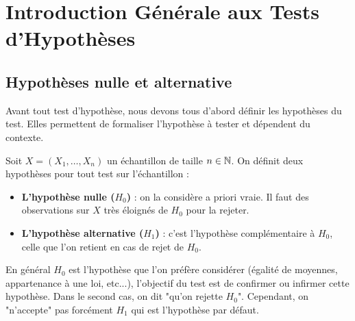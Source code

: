 
\minitoc  %





\section{Introduction Générale aux Tests d'Hypothèses}

\subsection{Hypothèses nulle et alternative}

Avant tout test d'hypothèse, nous devons tous d'abord définir les hypothèses du test. 
Elles permettent de formaliser l'hypothèse à tester et dépendent du contexte. 

\newpage 

\begin{definition}
    Soit $X = (X_1, \dots, X_n)$ un échantillon de taille $n \in \mathbb{N}$. On définit deux hypothèses pour tout test sur 
    l'échantillon : 
    \begin{itemize}
        \item \textbf{L'hypothèse nulle ($H_0$)} : on la considère a priori vraie. Il faut des observations sur $X$ très 
         éloignés de $H_0$ pour la rejeter. 
        \item \textbf{L'hypothèse alternative ($H_1$)} : c'est l'hypothèse complémentaire à $H_0$, celle que l'on 
        retient en cas de rejet de $H_0$. 
    \end{itemize}
\end{definition}

En général $H_0$ est l'hypothèse que l'on préfère considérer (égalité de moyennes, appartenance à une loi, etc...), 
l'objectif du test est de confirmer ou infirmer cette hypothèse. Dans le second cas, on dit "qu'on rejette $H_0$". 
Cependant, on "n'accepte" pas forcément $H_1$ qui est l'hypothèse par défaut. 

